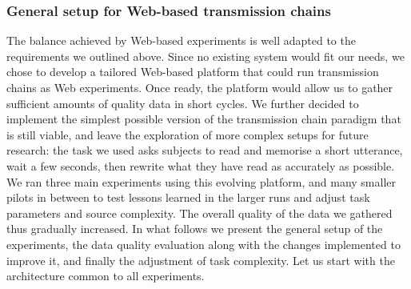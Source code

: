 \documentclass[a4paper,fleqn]{cas-dc}
\begin{document}

\subsubsection{General setup for Web-based transmission
chains}\label{general-setup-for-web-based-transmission-chains}

The balance achieved by Web-based experiments is well adapted to the
requirements we outlined above. Since no existing system would fit our
needs, we chose to develop a tailored Web-based platform that could run
transmission chains as Web experiments. Once ready, the platform would
allow us to gather sufficient amounts of quality data in short cycles.
We further decided to implement the simplest possible version of the
transmission chain paradigm that is still viable, and leave the
exploration of more complex setups for future research: the task we used
asks subjects to read and memorise a short utterance, wait a few
seconds, then rewrite what they have read as accurately as possible. We
ran three main experiments using this evolving platform, and many
smaller pilots in between to test lessons learned in the larger runs and
adjust task parameters and source complexity. The overall quality of the
data we gathered thus gradually increased. In what follows we present
the general setup of the experiments, the data quality evaluation along
with the changes implemented to improve it, and finally the adjustment
of task complexity. Let us start with the architecture common to all
experiments.
\end{document}

